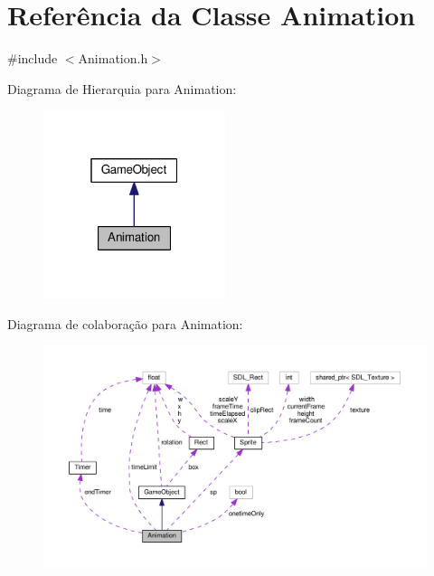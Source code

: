 \hypertarget{classAnimation}{\section{Referência da Classe Animation}
\label{classAnimation}
}


{\ttfamily \#include $<$Animation.\+h$>$}



Diagrama de Hierarquia para Animation\+:\nopagebreak
\begin{figure}[H]
\begin{center}
\leavevmode
\includegraphics[width=151pt]{classAnimation__inherit__graph}
\end{center}
\end{figure}


Diagrama de colaboração para Animation\+:
\nopagebreak
\begin{figure}[H]
\begin{center}
\leavevmode
\includegraphics[width=350pt]{classAnimation__coll__graph}
\end{center}
\end{figure}
